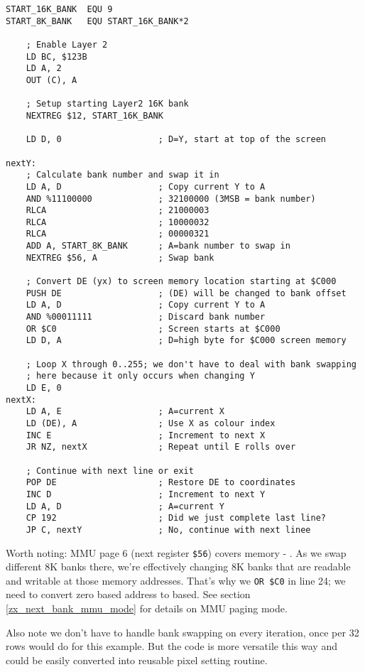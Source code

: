 \begin{lstlisting}
START_16K_BANK  EQU 9
START_8K_BANK   EQU START_16K_BANK*2

    ; Enable Layer 2
    LD BC, $123B
    LD A, 2
    OUT (C), A
    
    ; Setup starting Layer2 16K bank
    NEXTREG $12, START_16K_BANK
    
    LD D, 0                   ; D=Y, start at top of the screen
    
nextY:
    ; Calculate bank number and swap it in
    LD A, D                   ; Copy current Y to A
    AND %11100000             ; 32100000 (3MSB = bank number)
    RLCA                      ; 21000003
    RLCA                      ; 10000032
    RLCA                      ; 00000321
    ADD A, START_8K_BANK      ; A=bank number to swap in
    NEXTREG $56, A            ; Swap bank
    
    ; Convert DE (yx) to screen memory location starting at $C000
    PUSH DE                   ; (DE) will be changed to bank offset
    LD A, D                   ; Copy current Y to A
    AND %00011111             ; Discard bank number
    OR $C0                    ; Screen starts at $C000
    LD D, A                   ; D=high byte for $C000 screen memory

    ; Loop X through 0..255; we don't have to deal with bank swapping
    ; here because it only occurs when changing Y
    LD E, 0
nextX:
    LD A, E                   ; A=current X
    LD (DE), A                ; Use X as colour index
    INC E                     ; Increment to next X
    JR NZ, nextX              ; Repeat until E rolls over
    
    ; Continue with next line or exit
    POP DE                    ; Restore DE to coordinates
    INC D                     ; Increment to next Y
    LD A, D                   ; A=current Y
    CP 192                    ; Did we just complete last line?
    JP C, nextY               ; No, continue with next linee
\end{lstlisting}

Worth noting: MMU page 6 (next register {\tt \$56}) covers memory  - . As we swap different 8K banks there, we're effectively changing 8K banks that are readable and writable at those memory addresses. That's why we {\tt OR \$C0} in line 24; we need to convert zero based address to  based. See section \ref{zx_next_bank_mmu_mode} for details on MMU paging mode.

Also note we don't have to handle bank swapping on every iteration, once per 32 rows would do for this example. But the code is more versatile this way and could be easily converted into reusable pixel setting routine.


